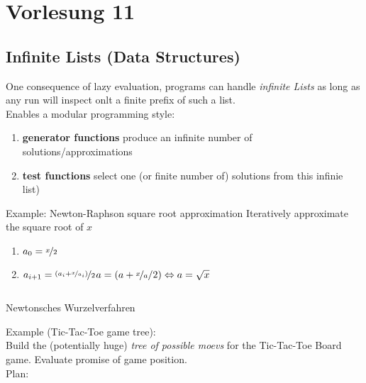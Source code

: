 \documentclass{article}
\begin{document}
\section{Vorlesung 11}
\subsection{Infinite Lists (Data Structures)}
One consequence of lazy evaluation, programs can handle \emph{infinite Lists} as long as any run will inspect onlt a finite prefix of such a list.\\
Enables a modular programming style:\\
\begin{enumerate}
\item \textbf{generator functions} produce an infinite number of solutions/approximations
\item \textbf{test functions} select one (or finite number of) solutions from this infinie list)
\end{enumerate}
Example: Newton-Raphson square root approximation
Iteratively approximate the square root of $x$
\begin{enumerate}
\item $a_0 = \nicefrac{x}{2}$
\item $a_{i+1} = \nicefrac{(a_i + \nicefrac{x}{a_i})}{2}$\hfill$a = (a + \nicefrac{x}{a}/2) \Leftrightarrow a = \sqrt{x}$
\end{enumerate}
\begin{listing}
\inputminted{Haskell}{sqrt.hs}
\caption{Newtonsches Wurzelverfahren}
\end{listing}
Example (Tic-Tac-Toe game tree):\\
Build the (potentially huge) \emph{tree of possible moevs} for the Tic-Tac-Toe Board game. Evaluate promise of game position.\\
Plan:\\
\end{document}
